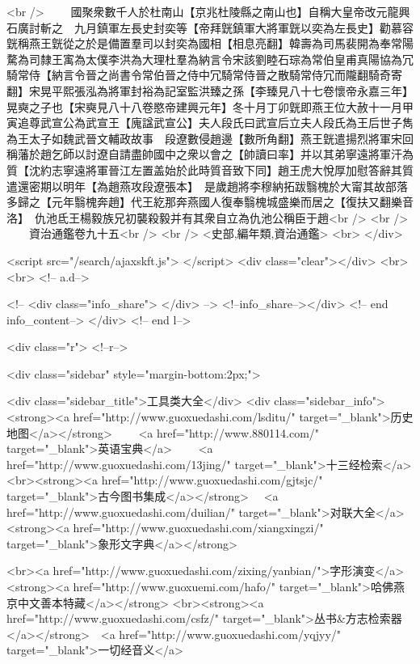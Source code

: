 <br />
　　國聚衆數千人於杜南山【京兆杜陵縣之南山也】自稱大皇帝改元龍興石廣討斬之　九月鎮軍左長史封奕等【帝拜皝鎮軍大將軍皝以奕為左長史】勸慕容皝稱燕王皝從之於是備置羣司以封奕為國相【相息亮翻】韓壽為司馬裴開為奉常陽騖為司隸王㝢為太僕李洪為大理杜羣為納言令宋該劉睦石琮為常伯皇甫真陽協為冗騎常侍【納言令晉之尚書令常伯晉之侍中冗騎常侍晉之散騎常侍冗而隴翻騎奇寄翻】宋晃平熙張泓為將軍封裕為記室監洪臻之孫【李臻見八十七卷懷帝永嘉三年】晃奭之子也【宋奭見八十八卷愍帝建興元年】冬十月丁卯皝即燕王位大赦十一月甲寅追尊武宣公為武宣王【廆諡武宣公】夫人段氏曰武宣后立夫人段氏為王后世子雋為王太子如魏武晉文輔政故事　段遼數侵趙邊【數所角翻】燕王皝遣揚烈將軍宋回稱藩於趙乞師以討遼自請盡帥國中之衆以會之【帥讀曰率】并以其弟寧遠將軍汗為質【沈約志寧遠將軍晉江左置盖始於此時質音致下同】趙王虎大悅厚加慰答辭其質遣還密期以明年【為趙燕攻段遼張本】　是歲趙將李穆納拓跋翳槐於大甯其故部落多歸之【元年翳槐奔趙】代王紇那奔燕國人復奉翳槐城盛樂而居之【復扶又翻樂音洛】　仇池氐王楊毅族兄初襲殺毅并有其衆自立為仇池公稱臣于趙<br />
<br />
　　資治通鑑卷九十五<br />
<br />
<史部,編年類,資治通鑑>  <br>
   </div> 

<script src="/search/ajaxskft.js"> </script>
 <div class="clear"></div>
<br>
<br>
 <!-- a.d-->

 <!--
<div class="info_share">
</div> 
-->
 <!--info_share--></div>   <!-- end info_content-->
  </div> <!-- end l-->

<div class="r">   <!--r-->



<div class="sidebar"  style="margin-bottom:2px;">

 
<div class="sidebar_title">工具类大全</div>
<div class="sidebar_info">
<strong><a href="http://www.guoxuedashi.com/lsditu/" target="_blank">历史地图</a></strong>　　
<a href="http://www.880114.com/" target="_blank">英语宝典</a>　　
<a href="http://www.guoxuedashi.com/13jing/" target="_blank">十三经检索</a>　
<br><strong><a href="http://www.guoxuedashi.com/gjtsjc/" target="_blank">古今图书集成</a></strong>　
<a href="http://www.guoxuedashi.com/duilian/" target="_blank">对联大全</a>　<strong><a href="http://www.guoxuedashi.com/xiangxingzi/" target="_blank">象形文字典</a></strong>　

<br><a href="http://www.guoxuedashi.com/zixing/yanbian/">字形演变</a>　　<strong><a href="http://www.guoxuemi.com/hafo/" target="_blank">哈佛燕京中文善本特藏</a></strong>
<br><strong><a href="http://www.guoxuedashi.com/csfz/" target="_blank">丛书&方志检索器</a></strong>　<a href="http://www.guoxuedashi.com/yqjyy/" target="_blank">一切经音义</a>　　

